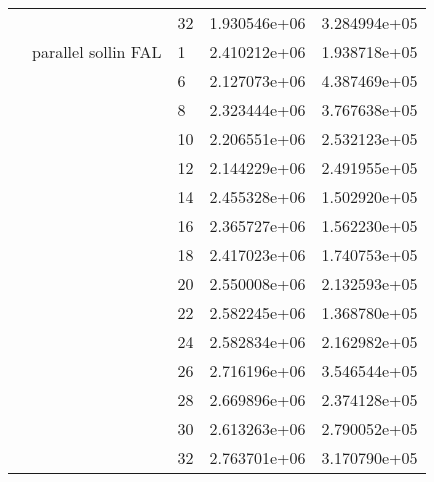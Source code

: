 \begin{tabular}{lllrr}
                      &                     & 32 &  1.930546e+06 &  3.284994e+05 \\
                      & parallel sollin FAL & 1  &  2.410212e+06 &  1.938718e+05 \\
                      &                     & 6  &  2.127073e+06 &  4.387469e+05 \\
                      &                     & 8  &  2.323444e+06 &  3.767638e+05 \\
                      &                     & 10 &  2.206551e+06 &  2.532123e+05 \\
                      &                     & 12 &  2.144229e+06 &  2.491955e+05 \\
                      &                     & 14 &  2.455328e+06 &  1.502920e+05 \\
                      &                     & 16 &  2.365727e+06 &  1.562230e+05 \\
                      &                     & 18 &  2.417023e+06 &  1.740753e+05 \\
                      &                     & 20 &  2.550008e+06 &  2.132593e+05 \\
                      &                     & 22 &  2.582245e+06 &  1.368780e+05 \\
                      &                     & 24 &  2.582834e+06 &  2.162982e+05 \\
                      &                     & 26 &  2.716196e+06 &  3.546544e+05 \\
                      &                     & 28 &  2.669896e+06 &  2.374128e+05 \\
                      &                     & 30 &  2.613263e+06 &  2.790052e+05 \\
                      &                     & 32 &  2.763701e+06 &  3.170790e+05 \\
\bottomrule
\end{tabular}
